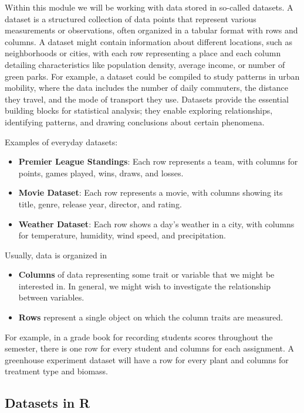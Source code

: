 \documentclass[
  letterpaper,
  DIV=11,
  numbers=noendperiod]{scrreprt}
\providecommand{\tightlist}{%
  \setlength{\itemsep}{0pt}\setlength{\parskip}{0pt}}
\begin{document}
Within this module we will be working with data stored in so-called
datasets. A dataset is a structured collection of data points that
represent various measurements or observations, often organized in a
tabular format with rows and columns. A dataset might contain
information about different locations, such as neighborhoods or cities,
with each row representing a place and each column detailing
characteristics like population density, average income, or number of
green parks. For example, a dataset could be compiled to study patterns
in urban mobility, where the data includes the number of daily
commuters, the distance they travel, and the mode of transport they use.
Datasets provide the essential building blocks for statistical analysis;
they enable exploring relationships, identifying patterns, and drawing
conclusions about certain phenomena.

Examples of everyday datasets:

\begin{itemize}
\tightlist
\item
  \textbf{Premier League Standings}: Each row represents a team, with
  columns for points, games played, wins, draws, and losses.
\item
  \textbf{Movie Dataset}: Each row represents a movie, with columns
  showing its title, genre, release year, director, and rating.
\item
  \textbf{Weather Dataset}: Each row shows a day's weather in a city,
  with columns for temperature, humidity, wind speed, and precipitation.
\end{itemize}

Usually, data is organized in

\begin{itemize}
\tightlist
\item
  \textbf{Columns} of data representing some trait or variable that we
  might be interested in. In general, we might wish to investigate the
  relationship between variables.
\item
  \textbf{Rows} represent a single object on which the column traits are
  measured.
\end{itemize}

For example, in a grade book for recording students scores throughout
the semester, there is one row for every student and columns for each
assignment. A greenhouse experiment dataset will have a row for every
plant and columns for treatment type and biomass.

\subsection{Datasets in R}\label{datasets-in-r}
\end{document}
